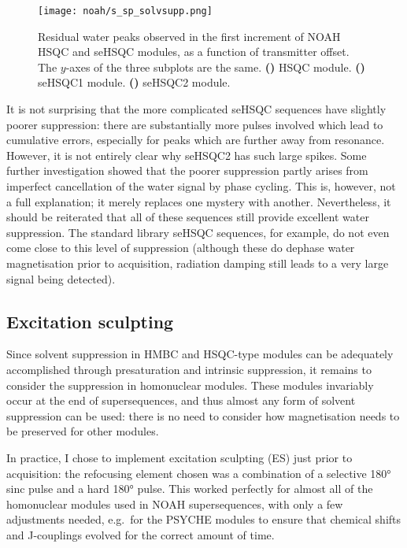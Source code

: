 \begin{figure}[!ht]
    \centering
    \texttt{[image: noah/s\_sp\_solvsupp.png]}%
    {\label{fig:s_sp_solvsupp_s}}%
    {\label{fig:s_sp_solvsupp_spv1}}%
    {\label{fig:s_sp_solvsupp_spv2}}%
    \caption[Comparison of solvent suppression in HSQC and seHSQC modules]{
        Residual water peaks observed in the first increment of NOAH HSQC and seHSQC modules, as a function of transmitter offset.
        The $y$-axes of the three subplots are the same.
        \textbf{()} HSQC module.
        \textbf{()} seHSQC1 module.
        \textbf{()} seHSQC2 module.
    }
    \label{fig:s_sp_solvsupp}
\end{figure}

It is not surprising that the more complicated seHSQC sequences have slightly poorer suppression: there are substantially more pulses involved which lead to cumulative errors, especially for peaks which are further away from resonance.
However, it is not entirely clear why seHSQC2 has such large spikes.
Some further investigation showed that the poorer suppression partly arises from imperfect cancellation of the water signal by phase cycling.
This is, however, not a full explanation; it merely replaces one mystery with another.
Nevertheless, it should be reiterated that all of these sequences still provide excellent water suppression.
The standard library seHSQC sequences, for example, do not even come close to this level of suppression (although these do dephase water magnetisation prior to acquisition, radiation damping still leads to a very large signal being detected).


\subsection{Excitation sculpting}

Since solvent suppression in HMBC and HSQC-type modules can be adequately accomplished through presaturation and intrinsic suppression, it remains to consider the suppression in homonuclear modules.
These modules invariably occur at the end of supersequences, and thus almost any form of solvent suppression can be used: there is no need to consider how magnetisation needs to be preserved for other modules.

In practice, I chose to implement excitation sculpting\autocite{Hwang1995JMRSA} (ES) just prior to acquisition: the refocusing element chosen was a combination of a selective \ang{180} sinc pulse and a hard \ang{180} pulse.
This worked perfectly for almost all of the homonuclear modules used in NOAH supersequences, with only a few adjustments needed, e.g.\ for the PSYCHE modules to ensure that chemical shifts and J-couplings evolved for the correct amount of time.

